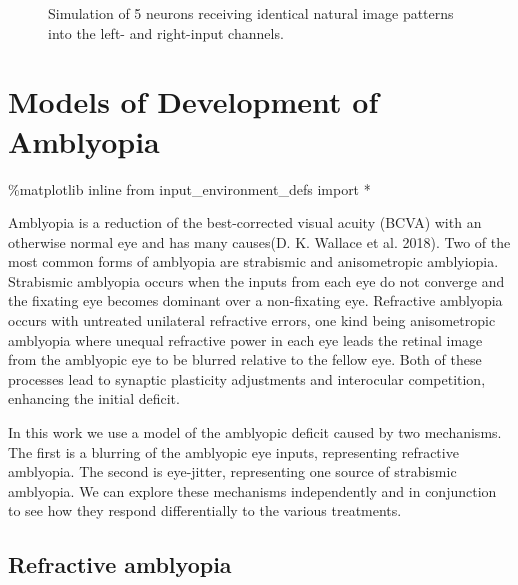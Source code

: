 \documentclass[
  letterpaper,
]{book}
\newenvironment{Shaded}{\begin{snugshade}}{\end{snugshade}}
\newcommand{\ImportTok}[1]{\textcolor[rgb]{0.00,0.46,0.62}{#1}}
\newcommand{\NormalTok}[1]{\textcolor[rgb]{0.00,0.23,0.31}{#1}}
\newcommand{\OperatorTok}[1]{\textcolor[rgb]{0.37,0.37,0.37}{#1}}
\begin{document}
\begin{figure}
\begin{minipage}[t]{\linewidth}
{{}

}

\end{minipage}%

\caption{\label{fig-nr_sim}Simulation of 5 neurons receiving identical
natural image patterns into the left- and right-input channels.}

\end{figure}

\hypertarget{sec-models-of-development}{%
\chapter{Models of Development of
Amblyopia}\label{sec-models-of-development}}

\begin{Shaded}
\begin{Highlighting}[]
\OperatorTok{\%}\NormalTok{matplotlib inline}
\ImportTok{from}\NormalTok{ input\_environment\_defs }\ImportTok{import} \OperatorTok{*}
\end{Highlighting}
\end{Shaded}

Amblyopia is a reduction of the best-corrected visual acuity (BCVA) with
an otherwise normal eye and has many causes(D. K. Wallace et al. 2018).
Two of the most common forms of amblyopia are strabismic and
anisometropic amblyiopia. Strabismic amblyopia occurs when the inputs
from each eye do not converge and the fixating eye becomes dominant over
a non-fixating eye. Refractive amblyopia occurs with untreated
unilateral refractive errors, one kind being anisometropic amblyopia
where unequal refractive power in each eye leads the retinal image from
the amblyopic eye to be blurred relative to the fellow eye. Both of
these processes lead to synaptic plasticity adjustments and interocular
competition, enhancing the initial deficit.

In this work we use a model of the amblyopic deficit caused by two
mechanisms. The first is a blurring of the amblyopic eye inputs,
representing refractive amblyopia. The second is eye-jitter,
representing one source of strabismic amblyopia. We can explore these
mechanisms independently and in conjunction to see how they respond
differentially to the various treatments.

\hypertarget{refractive-amblyopia}{%
\section{Refractive amblyopia}\label{refractive-amblyopia}}
\end{document}
